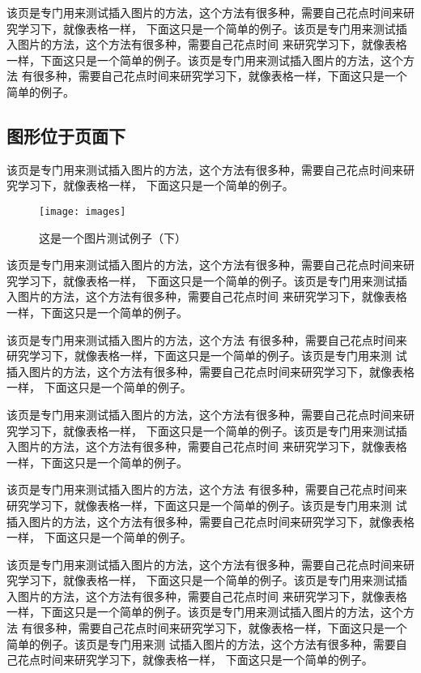 该页是专门用来测试插入图片的方法，这个方法有很多种，需要自己花点时间来研究学习下，就像表格一样，
下面这只是一个简单的例子。该页是专门用来测试插入图片的方法，这个方法有很多种，需要自己花点时间
来研究学习下，就像表格一样，下面这只是一个简单的例子。该页是专门用来测试插入图片的方法，这个方法
有很多种，需要自己花点时间来研究学习下，就像表格一样，下面这只是一个简单的例子。

\subsection{图形位于页面下}
该页是专门用来测试插入图片的方法，这个方法有很多种，需要自己花点时间来研究学习下，就像表格一样，
下面这只是一个简单的例子。

\begin{figure}[b]
 \centering
 \texttt{[image: images]}
 \caption{这是一个图片测试例子（下）}
 \label{fig:amss3}
\end{figure}


该页是专门用来测试插入图片的方法，这个方法有很多种，需要自己花点时间来研究学习下，就像表格一样，
下面这只是一个简单的例子。该页是专门用来测试插入图片的方法，这个方法有很多种，需要自己花点时间
来研究学习下，就像表格一样，下面这只是一个简单的例子。

该页是专门用来测试插入图片的方法，这个方法
有很多种，需要自己花点时间来研究学习下，就像表格一样，下面这只是一个简单的例子。该页是专门用来测
试插入图片的方法，这个方法有很多种，需要自己花点时间来研究学习下，就像表格一样，
下面这只是一个简单的例子。

该页是专门用来测试插入图片的方法，这个方法有很多种，需要自己花点时间来研究学习下，就像表格一样，
下面这只是一个简单的例子。该页是专门用来测试插入图片的方法，这个方法有很多种，需要自己花点时间
来研究学习下，就像表格一样，下面这只是一个简单的例子。

该页是专门用来测试插入图片的方法，这个方法
有很多种，需要自己花点时间来研究学习下，就像表格一样，下面这只是一个简单的例子。该页是专门用来测
试插入图片的方法，这个方法有很多种，需要自己花点时间来研究学习下，就像表格一样，
下面这只是一个简单的例子。

该页是专门用来测试插入图片的方法，这个方法有很多种，需要自己花点时间来研究学习下，就像表格一样，
下面这只是一个简单的例子。该页是专门用来测试插入图片的方法，这个方法有很多种，需要自己花点时间
来研究学习下，就像表格一样，下面这只是一个简单的例子。该页是专门用来测试插入图片的方法，这个方法
有很多种，需要自己花点时间来研究学习下，就像表格一样，下面这只是一个简单的例子。该页是专门用来测
试插入图片的方法，这个方法有很多种，需要自己花点时间来研究学习下，就像表格一样，
下面这只是一个简单的例子。

